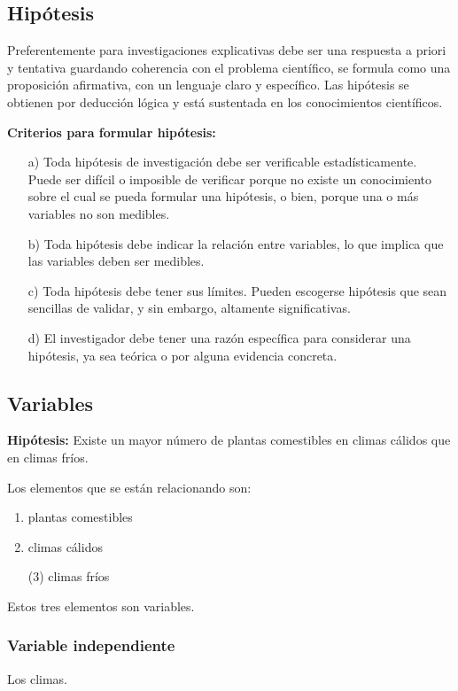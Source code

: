 \documentclass[a4paper, 12pt]{article}
\begin{document}
\subsection{Hipótesis}
Preferentemente para investigaciones explicativas debe ser una respuesta a priori y tentativa guardando coherencia con el problema científico, se formula como una proposición afirmativa, con un lenguaje claro y específico.  Las hipótesis se obtienen por deducción lógica y está sustentada en los conocimientos científicos. \par  
\vskip 0.3cm
{\bf Criterios para formular hipótesis:} \cite{Erica}
\begin{enumerate}
\item[a)] Toda hipótesis de investigación debe ser verificable estadísticamente.  Puede ser difícil o imposible de verificar porque no existe un conocimiento sobre el cual se pueda formular una hipótesis, o bien, porque una o más variables no son medibles.
\vskip 0.2cm
\item[b)] Toda hipótesis debe indicar la relación entre variables, lo que implica que las variables deben ser medibles.
\vskip 0.2cm
\item[c)] Toda hipótesis debe tener sus límites. Pueden escogerse hipótesis que sean sencillas de validar, y sin embargo, altamente significativas.
\vskip 0.2cm
\item[d)] El investigador debe tener una razón específica para considerar una hipótesis, ya sea teórica o por alguna evidencia concreta.    
\end{enumerate}


\subsection{Variables}
{\bf Hipótesis:} Existe un mayor número de plantas comestibles en climas cálidos que en climas fríos. \par 
\vskip 0.2cm
Los elementos que se están relacionando son: \par 
\begin{enumerate} [(1)]
	\item  plantas comestibles
	\item  climas cálidos
	\item[(3)] climas fríos
\end{enumerate} 
Estos tres elementos son variables.

\vskip 0.2cm  
\subsubsection{Variable independiente}
Los climas.
\end{document}

